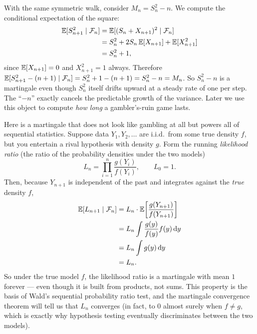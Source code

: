 \begin{example}
\label{ch28:ex-variance}
With the same symmetric walk, consider $M_n = S_n^2 - n$. We compute the conditional expectation of the square:
\begin{align*}
  \operatorname{\mathbb{E}}[S_{n+1}^2 \mid \mathcal{F}_n] &= \operatorname{\mathbb{E}}[(S_n + X_{n+1})^2 \mid \mathcal{F}_n] \\
  &= S_n^2 + 2 S_n \operatorname{\mathbb{E}}[X_{n+1}] + \operatorname{\mathbb{E}}[X_{n+1}^2] \\
  &= S_n^2 + 1,
\end{align*}
since $\operatorname{\mathbb{E}}[X_{n+1}] = 0$ and $X_{n+1}^2 = 1$ always. Therefore
$\operatorname{\mathbb{E}}[S_{n+1}^2 - (n+1)\mid\mathcal{F}_n] = S_n^2 + 1 - (n+1) = S_n^2 - n = M_n$. So $S_n^2 - n$ is a
martingale even though $S_n^2$ itself drifts upward at a steady rate of one per step. The ``$-n$''
exactly cancels the predictable growth of the variance. Later we use this object to compute
\emph{how long} a gambler's-ruin game lasts.
\end{example}

\begin{example}
\label{ch28:ex-lr}
Here is a martingale that does not look like gambling at all but powers all of sequential statistics.
Suppose data $Y_1, Y_2, \dots$ are i.i.d.\ from some true density $f$, but you entertain a rival
hypothesis with density $g$. Form the running \emph{likelihood ratio} (the ratio of the probability densities under the two models)
\[
  L_n = \prod_{i=1}^{n} \frac{g(Y_i)}{f(Y_i)}, \qquad L_0 = 1.
\]
Then, because $Y_{n+1}$ is independent of the past and integrates against the \emph{true} density $f$,
\begin{align*}
  \operatorname{\mathbb{E}}[L_{n+1}\mid\mathcal{F}_n] &= L_n \cdot \operatorname{\mathbb{E}}\!\left[\frac{g(Y_{n+1})}{f(Y_{n+1})}\right] \\
  &= L_n \int \frac{g(y)}{f(y)} f(y)\,\mathrm{d} y \\
  &= L_n \int g(y)\,\mathrm{d} y \\
  &= L_n.
\end{align*}
So under the true model $f$, the likelihood ratio is a martingale with mean $1$ forever --- even though
it is built from products, not sums. This property is the basis of Wald's sequential probability ratio test, and the martingale convergence theorem will tell us that $L_n$ converges (in
fact, to $0$ almost surely when $f \ne g$, which is exactly why hypothesis testing eventually
discriminates between the two models).
\end{example}


